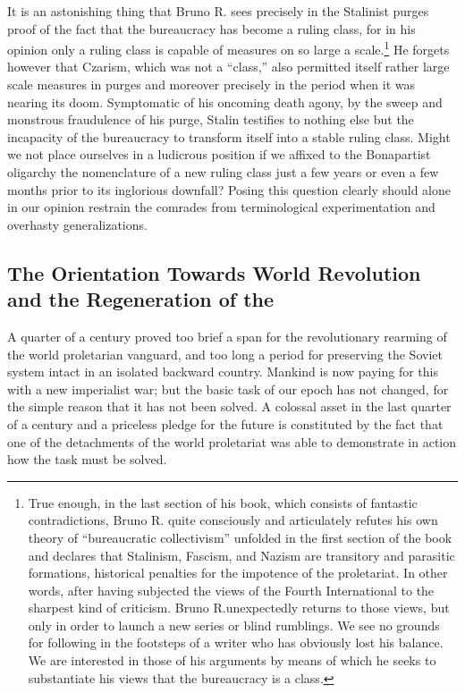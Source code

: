 It is an astonishing thing that Bruno R. sees precisely in the Stalinist purges proof of the fact that the bureaucracy has become a ruling class, for in his opinion only a ruling class is capable of measures on so large a scale.\footnote{True enough, in the last section of his book, which consists of fantastic contradictions, Bruno R. quite consciously and articulately refutes his own theory of “bureaucratic collectivism” unfolded in the first section of the book and declares that Stalinism, Fascism, and Nazism are transitory and parasitic formations, historical penalties for the impotence of the proletariat. In other words, after having subjected the views of the Fourth International to the sharpest kind of criticism. Bruno R.\@ unexpectedly returns to those views, but only in order to launch a new series or blind rumblings. We see no grounds for following in the footsteps of a writer who has obviously lost his balance. We are interested in those of his arguments by means of which he seeks to substantiate his views that the bureaucracy is a class.} He forgets however that Czarism, which was not a “class,” also permitted itself rather large scale measures in purges and moreover precisely in the period when it was nearing its doom. Symptomatic of his oncoming death agony, by the sweep and monstrous fraudulence of his purge, Stalin testifies to nothing else but the incapacity of the bureaucracy to transform itself into a stable ruling class. Might we not place ourselves in a ludicrous position if we affixed to the Bonapartist oligarchy the nomenclature of a new ruling class just a few years or even a few months prior to its inglorious downfall? Posing this question clearly should alone in our opinion restrain the comrades from terminological experimentation and overhasty generalizations.

\subsection*{The Orientation Towards World Revolution and the Regeneration of the \USSR}

A quarter of a century proved too brief a span for the revolutionary rearming of the world proletarian vanguard, and too long a period for preserving the Soviet system intact in an isolated backward country. Mankind is now paying for this with a new imperialist war; but the basic task of our epoch has not changed, for the simple reason that it has not been solved. A colossal asset in the last quarter of a century and a priceless pledge for the future is constituted by the fact that one of the detachments of the world proletariat was able to demonstrate in action how the task must be solved.

